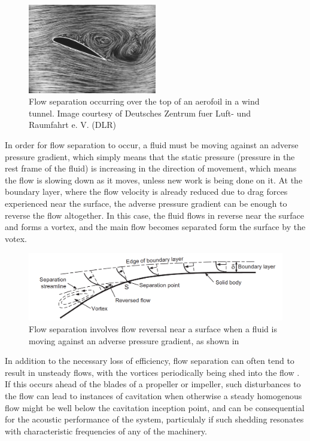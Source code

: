 \documentclass{article}\usepackage[]{graphicx}\usepackage[]{color}
\begin{document}
\begin{figure}
\includegraphics[width=0.5\textwidth]{SeparatedAerofoil.jpg}
\caption{Flow separation occurring over the top of an aerofoil in a wind tunnel. Image courtesy of Deutsches Zentrum fuer Luft- und Raumfahrt e. V. (DLR)}
\label{fig:SeparatedAerofoil.jpg}
\end{figure}

In order for flow separation to occur, a fluid must be moving against an adverse pressure gradient, which simply means that the static pressure (pressure in the rest frame of the fluid) is increasing in the direction of movement, which means the flow is slowing down as it moves, unless new work is being done on it.  At the boundary layer, where the flow velocity is already reduced due to drag forces experienced near the surface, the adverse pressure gradient can be enough to reverse the flow altogether.  In this case, the fluid flows in reverse near the surface and forms a vortex, and the main flow becomes separated form the surface by the votex.

\begin{figure}
\includegraphics[width=\textwidth]{FlowSeparation.png}
\caption{Flow separation involves flow reversal near a surface when a fluid is moving against an adverse pressure gradient, as shown in \parencite{mollard2011}}
\label{fig:FlowSeparation.png}
\end{figure}

In addition to the necessary loss of efficiency, flow separation can often tend to result in unsteady flows, with the vortices periodically being shed into the flow \parencite[480]{mollard2011}.  If this occurs ahead of the blades of a propeller or impeller, such disturbances to the flow can lead to instances of cavitation when otherwise a steady homogenous flow might be well below the cavitation inception point, and can be consequential for the acoustic performance of the system, particulaly if such shedding resonates with characteristic frequencies of any of the machinery.
\end{document}
